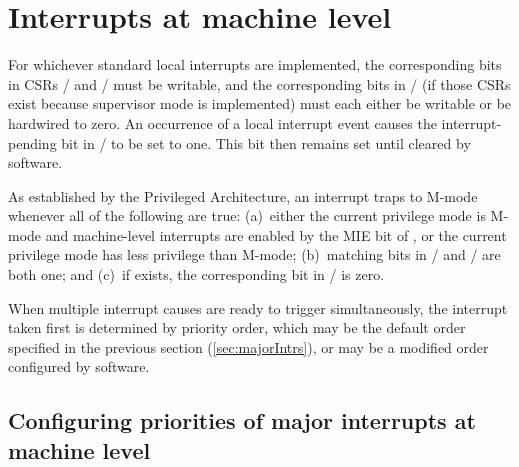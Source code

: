 \section{Interrupts at machine level}

For whichever standard local interrupts are
implemented, the corresponding bits in CSRs
/ and / must be writable, and the
corresponding bits in / (if those CSRs exist
because supervisor mode is implemented) must each either be writable or
be hardwired to zero.
An occurrence of a local interrupt event causes the interrupt-pending bit
in / to be set to one.
This bit then remains set until cleared by software.

As established by the {\RISCV} Privileged Architecture, an interrupt
traps to \mbox{M-mode} whenever all of the following are true:
(a)~either the current privilege mode is \mbox{M-mode} and
machine-level interrupts are enabled by the MIE bit of , or
the current privilege mode has less privilege than \mbox{M-mode};
(b)~matching bits in / and / are both
one; and
(c)~if  exists, the corresponding bit in
/ is zero.

When multiple interrupt causes are ready to trigger simultaneously, the
interrupt taken first is determined by priority order, which may be the
default order specified in the previous section
(\ref{sec:majorIntrs}), or may be a modified order configured
by software.

\subsection{Configuring priorities of major interrupts at machine level}
\label{sec:intrPrios-M}

